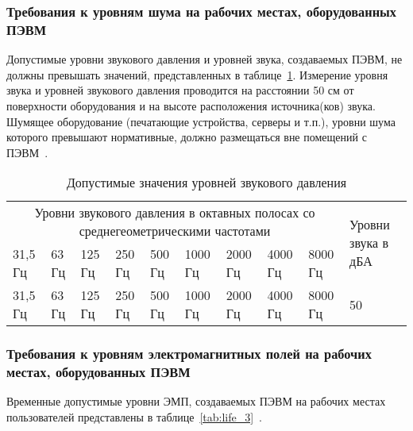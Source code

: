 \subsubsection{Требования к уровням шума на рабочих местах, оборудованных ПЭВМ}

Допустимые уровни звукового давления и уровней звука, создаваемых ПЭВМ, не должны превышать значений, 
представленных в таблице~\ref{tab:life_2}. Измерение уровня звука и уровней звукового давления 
проводится на расстоянии 50 см от поверхности оборудования и на высоте расположения 
источника(ков) звука. Шумящее оборудование (печатающие устройства, серверы и т.п.), уровни шума которого превышают нормативные, должно 
размещаться вне помещений с ПЭВМ~\cite{sanpin_2.4.1340-03}.

\begin{table}[h!]
\caption{ Допустимые значения уровней звукового давления }
\label{tab:life_2}
\begin{center}
\begin{tabularx}{\linewidth}{|X|X|X|X|X|X|X|X|X|X|}
\hline
\multicolumn{9}{|c|}{Уровни звукового давления в октавных полосах со среднегеометрическими частотами} & \multirow{2}{\hsize}{Уровни звука в дБА}\\
\cline{1-9}
31,5 Гц & 63 Гц & 125 Гц & 250 Гц & 500 Гц & 1000 Гц & 2000 Гц & 4000 Гц & 8000 Гц & \\
\hline
31,5 Гц & 63 Гц & 125 Гц & 250 Гц & 500 Гц & 1000 Гц & 2000 Гц & 4000 Гц & 8000 Гц & 50\\
\hline
\end{tabularx}
\end{center}
\end{table}




\subsubsection{Требования к уровням электромагнитных полей на рабочих местах, оборудованных ПЭВМ}

Временные допустимые уровни ЭМП, создаваемых ПЭВМ на рабочих местах пользователей
представлены в таблице~\ref{tab:life_3}~\cite{sanpin_2.4.1340-03}.

